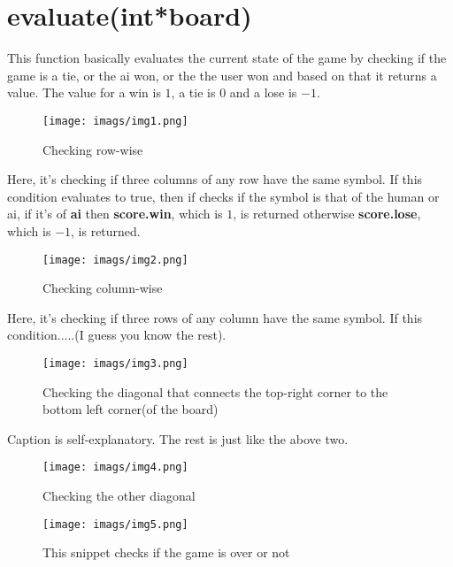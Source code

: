\documentclass{article}
\makeatletter
\renewcommand\paragraph{\@startsection{paragraph}{4}{\z@}{-3.25ex \@plus -1ex \@minus -.2ex}{1.5ex \@plus .2ex}{\normalfont\normalsize\bfseries}}
\makeatother
\begin{document}
	\section{evaluate(int*board)}
	\paragraph{What it does}
	
	This function basically evaluates the current state of the game by checking if the game is a tie, or the ai won, or the the user won and based on that it returns a value. The value for a win is $1$, a tie is $0$ and a lose is $-1$.
	
	\begin{figure}[h]
		\centering
		\texttt{[image: imags/img1.png]}
		\caption{Checking row-wise}
		\label{fig:fig1}
	\end{figure}

Here, it's checking if three columns of any row have the same symbol. If this condition evaluates to true, then if checks if the symbol is that of the human or ai, if it's of \textbf{ai} then \textbf{score.win}, which is $1$, is returned otherwise \textbf{score.lose}, which is $-1$, is returned.

\begin{figure}[h]
	\centering
	\texttt{[image: imags/img2.png]}
	\caption{Checking column-wise}
	\label{fig:fig2}
\end{figure}

Here, it's checking if three rows of any column have the same symbol. If this condition.....(I guess you know the rest).
\newpage
\begin{figure}[h]
	\centering
	\texttt{[image: imags/img3.png]}
	\caption{Checking the diagonal that connects the top-right corner to the bottom left corner(of the board)}
	\label{fig:fig3}
\end{figure}

Caption is self-explanatory. The rest is just like the above two.

\begin{figure}[h]
	\centering
	\texttt{[image: imags/img4.png]}
	\caption{Checking the other diagonal}
	\label{fig:fig4}
\end{figure}

\begin{figure}[h]
	\centering
	\texttt{[image: imags/img5.png]}
	\caption{This snippet checks if the game is over or not}
	\label{fig:fig5}
\end{figure}
\end{document}
